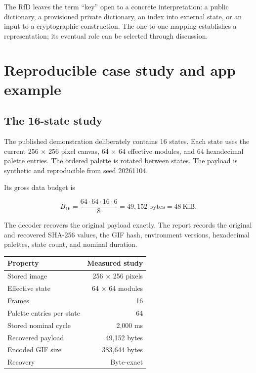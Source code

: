 \documentclass[
  11pt,
  a4paper,
]{article}
\begin{document}
The RfD leaves the term ``key'' open to a concrete interpretation: a
public dictionary, a provisioned private dictionary, an index into
external state, or an input to a cryptographic construction. The
one-to-one mapping establishes a representation; its eventual role can
be selected through discussion.

\hypertarget{reproducible-case-study-and-app-example}{%
\section{Reproducible case study and app
example}\label{reproducible-case-study-and-app-example}}

\hypertarget{the-16-state-study}{%
\subsection{The 16-state study}\label{the-16-state-study}}

The published demonstration deliberately contains 16 states. Each state
uses the current 256 × 256 pixel canvas, 64 × 64 effective modules, and
64 hexadecimal palette entries. The ordered palette is rotated between
states. The payload is synthetic and reproducible from seed 20261104.

Its gross data budget is

\[
B_{16}=\frac{64\cdot64\cdot16\cdot6}{8}
=49{,}152\ \text{bytes}=48\ \text{KiB}.
\]

The decoder recovers the original payload exactly. The report records
the original and recovered SHA-256 values, the GIF hash, environment
versions, hexadecimal palettes, state count, and nominal duration.

\begin{longtable}[]{@{}lr@{}}
\toprule\noalign{}
Property & Measured study \\
\midrule\noalign{}
\endhead
\bottomrule\noalign{}
\endlastfoot
Stored image & 256 × 256 pixels \\
Effective state & 64 × 64 modules \\
Frames & 16 \\
Palette entries per state & 64 \\
Stored nominal cycle & 2,000 ms \\
Recovered payload & 49,152 bytes \\
Encoded GIF size & 383,644 bytes \\
Recovery & Byte-exact \\
\end{longtable}
\end{document}
